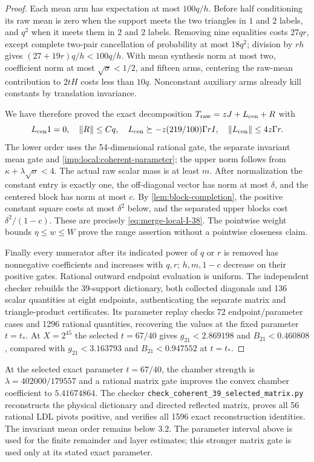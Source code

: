 \begin{proof}
Each mean arm has expectation at most $100q/h$.
Before half conditioning its raw mean is zero when the support
meets the two triangles in $1$ and $2$ labels, and $q^2$ when it meets them in $2$ and $2$ labels. Removing nine equalities
costs $27qr$, except complete two-pair cancellation of
probability at most $18q^2$; division by $r h$ gives
$(27+19r)q/h<100q/h$. With mean synthesis norm at most two,
coefficient norm at most $\sqrt\sigma<1/2$, and fifteen
arms, centering the raw-mean contribution to $2tH$ costs
less than $10q$. Nonconstant auxiliary arms already kill
constants by translation invariance.

We have therefore proved the exact decomposition
$T_{\rm raw}=zJ+L_{\rm cen}+R$ with
\begin{equation}\label{eq:merge-local-I-42}
 L_{\rm cen}1=0,\quad
 \|R\|\le Cq,\quad
 L_{\rm cen}\succeq-z(219/100)\Gamma rI,\quad
 \|L_{\rm cen}\|\le4z\Gamma r .
\end{equation}
The lower order uses the 54-dimensional rational gate, the
separate invariant mean gate and \cref{imp:local:coherent-parameter}; the upper norm follows
from $\kappa+\lambda\sqrt\sigma<4$.
The actual raw scalar mass is at least $m$.
After normalization the constant entry is exactly one,
the off-diagonal vector has norm at most $\delta$, and
the centered block has norm at most $c$.
By \cref{lem:block-completion}, the positive constant square costs
at most $\delta^2$ below, and the separated upper blocks cost
$\delta^2/(1-c)$. These are precisely \eqref{eq:merge-local-I-38}.
The pointwise weight bounds $\eta\le w\le W$ prove the
range assertion without a pointwise closeness claim.

Finally every numerator after its indicated power of $q$
or $r$ is removed has nonnegative coefficients and
increases with $q,r$; $h,m,1-c$ decrease on their positive
gates. Rational outward endpoint evaluation is uniform.
The independent checker rebuilds the 39-support dictionary,
both collected diagonals and 136 scalar quantities at
eight endpoints, authenticating the separate matrix and
triangle-product certificates. Its parameter replay checks 72
endpoint/parameter cases and 1296 rational quantities, recovering
the values at the fixed parameter $t=t_*$. At $X=2^{45}$ the selected
$t=67/40$ gives $g_{21}<2.869198$ and $B_{21}<0.460808$, compared
with $g_{21}<3.163793$ and $B_{21}<0.947552$ at $t=t_*$.
\end{proof}

At the selected exact parameter $t=67/40$, the chamber strength is
$\lambda=402000/179557$ and a rational matrix gate improves the
convex chamber coefficient to $5.41674864$.
The checker \texttt{check\_coherent\_39\_selected\_matrix.py}
reconstructs the physical dictionary and directed reflected matrix,
proves all 56 rational LDL pivots positive, and verifies all 1596
exact reconstruction identities. The invariant mean order remains
below $3.2$. The parameter interval above is used for the finite
remainder and layer estimates; this stronger matrix gate is used
only at its stated exact parameter.
